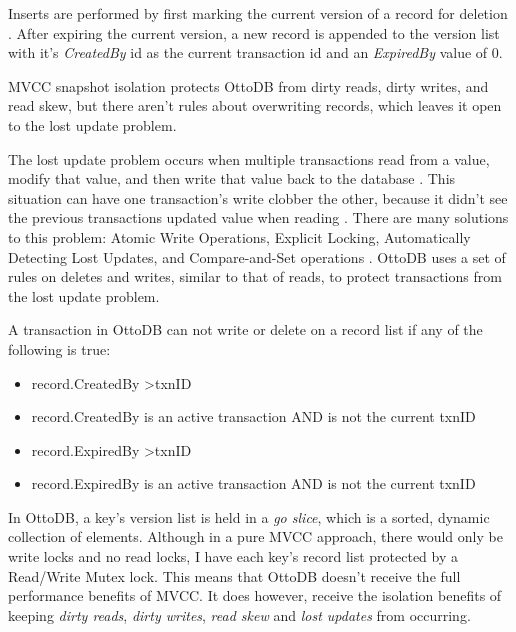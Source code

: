 \documentclass[conference]{IEEEtran}
\begin{document}
    Inserts are performed by first marking the current version of a record for deletion \cite[p. 240]{b18}. After expiring the current version, a new record is appended to the version list with it's \textit{CreatedBy} id as the current transaction id and an \textit{ExpiredBy} value of 0. 
    
    MVCC snapshot isolation protects OttoDB from dirty reads, dirty writes, and read skew, but there aren't rules about overwriting records, which leaves it open to the lost update problem. 
    
    
    The lost update problem occurs when multiple transactions read from a value, modify that value, and then write that value back to the database \cite[p. 243]{b18}. This situation can have one transaction's write clobber the other, because it didn't see the previous transactions updated value when reading \cite[p. 243]{b18}. There are many solutions to this problem: Atomic Write Operations, Explicit Locking, Automatically Detecting Lost Updates, and Compare-and-Set operations \cite[p. 243 - 245]{b18}. OttoDB uses a set of rules on deletes and writes, similar to that of reads, to protect transactions from the lost update problem.
    
    A transaction in OttoDB can not write or delete on a record list if any of the following is true:

    \begin{itemize}
        \item record.CreatedBy \textgreater \space txnID
        \item record.CreatedBy is an active transaction AND is not the current txnID
        \item record.ExpiredBy \textgreater \space txnID
        \item record.ExpiredBy is an active transaction AND is not the current txnID
    \end{itemize}
 
    In OttoDB, a key's version list is held in a \textit{go slice}, which is a sorted, dynamic collection of elements. Although in a pure MVCC approach, there would only be write locks and no read locks, I have each key's record list protected by a Read/Write Mutex lock. This means that OttoDB doesn't receive the full performance benefits of MVCC. It does however, receive the isolation benefits of keeping \textit{dirty reads}, \textit{dirty writes}, \textit{read skew} and \textit{lost updates} from occurring.
\end{document}
